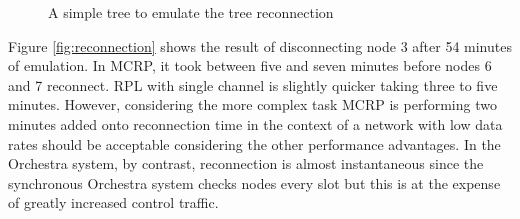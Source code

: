 \begin{figure}
\caption{A simple tree to emulate the tree reconnection}
\label{fig:reconnectionLayout}
\end{figure}

Figure \ref{fig:reconnection} shows the result of disconnecting node 3 after 54 minutes of emulation.  In MCRP, it took between five and seven minutes before nodes 6 and 7 reconnect.  RPL with single channel is slightly quicker taking three to five minutes. However, considering the more complex task MCRP is performing two minutes added onto reconnection time in the context of a network with low data rates should be acceptable considering the other performance advantages.  In the Orchestra system, by contrast, reconnection is almost instantaneous since the synchronous Orchestra system checks nodes every slot but this is at the expense of greatly increased control traffic.

